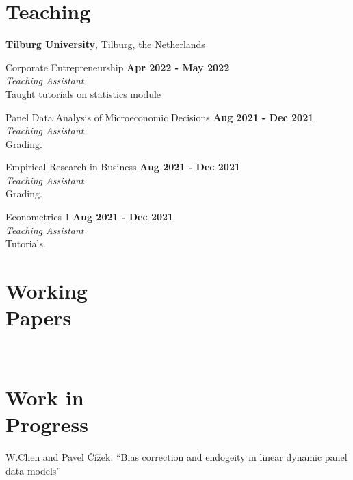 \documentclass[margin,line]{res}
\begin{document}
\begin{resume}
\section{\sc Teaching}
{\bf Tilburg University}, Tilburg, the Netherlands

\vspace{-.3cm}
Corporate Entrepreneurship \hfill {\bf Apr 2022 - May 2022}\\
 {\em Teaching Assistant}\\
Taught tutorials on statistics module

\vspace{-.3cm}
Panel Data Analysis of Microeconomic Decisions \hfill {\bf Aug 2021 - Dec 2021}\\
{\em Teaching Assistant}\\
Grading.

\vspace{-.3cm}
Empirical Research in Business \hfill {\bf Aug 2021 - Dec 2021}\\
{\em Teaching Assistant}\\
Grading.

\vspace{-.3cm}
Econometrics 1 \hfill {\bf Aug 2021 - Dec 2021}\\
{\em Teaching Assistant}\\
Tutorials.


\section{\sc Working \\ Papers}


\\


\section{\sc Work in \\ Progress}
W.Chen and Pavel \v{C}\'{i}\v{z}ek. ``Bias correction and endogeity in linear dynamic panel data models''


\end{resume}
\end{document}
